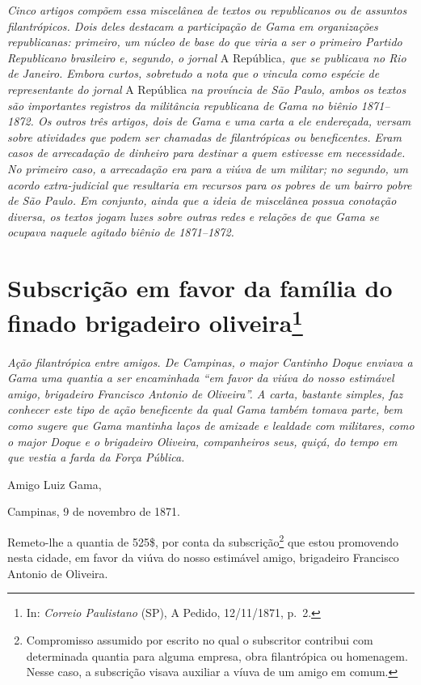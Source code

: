 \begin{didascalia}
\emph{Cinco artigos compõem essa miscelânea de textos ou republicanos ou
de assuntos filantrópicos. Dois deles destacam a participação de Gama em
organizações republicanas: primeiro, um núcleo de base do que viria a
ser o primeiro Partido Republicano brasileiro e, segundo, o jornal} A
República\emph{, que se publicava no Rio de Janeiro. Embora curtos,
sobretudo a nota que o vincula como espécie de representante do jornal}
A República \emph{na província de São Paulo, ambos os textos são
importantes registros da militância republicana de Gama no biênio
1871--1872. Os outros três artigos, dois de Gama e uma carta a ele
endereçada, versam sobre atividades que podem ser chamadas de
filantrópicas ou beneficentes. Eram casos de arrecadação de dinheiro
para destinar a quem estivesse em necessidade. No primeiro caso, a
arrecadação era para a viúva de um militar; no segundo, um acordo
extra-judicial que resultaria em recursos para os pobres de um bairro
pobre de São Paulo. Em conjunto, ainda que a ideia de miscelânea possua
conotação diversa, os textos jogam luzes sobre outras redes e relações
de que Gama se ocupava naquele agitado biênio de 1871--1872.}
\end{didascalia}

\chapter{Subscrição em favor da família do finado brigadeiro oliveira\footnote{ In: \emph{Correio Paulistano} (SP), A Pedido, 12/11/1871,
  p.~2.}} %

\begin{didascalia}
\emph{Ação filantrópica entre amigos. De Campinas, o major Cantinho
Doque enviava a Gama uma quantia a ser encaminhada ``em favor da viúva do
nosso estimável amigo, brigadeiro Francisco Antonio de Oliveira''. A
carta, bastante simples, faz conhecer este tipo de ação beneficente da
qual Gama também tomava parte, bem como sugere que Gama mantinha laços
de amizade e lealdade com militares, como o major Doque e o brigadeiro
Oliveira, companheiros seus, quiçá, do tempo em que vestia a farda da
Força Pública.}
\end{didascalia}

\asterisc{}

Amigo Luiz Gama,

Campinas, 9 de novembro de 1871.

Remeto-lhe a quantia de 525\$, por conta da subscrição\footnote{
  Compromisso assumido por escrito no qual o subscritor contribui com
  determinada quantia para alguma empresa, obra filantrópica ou
  homenagem. Nesse caso, a subscrição visava auxiliar a víuva de um
  amigo em comum.} que estou promovendo nesta cidade, em favor da viúva
do nosso estimável amigo, brigadeiro Francisco Antonio de Oliveira.

